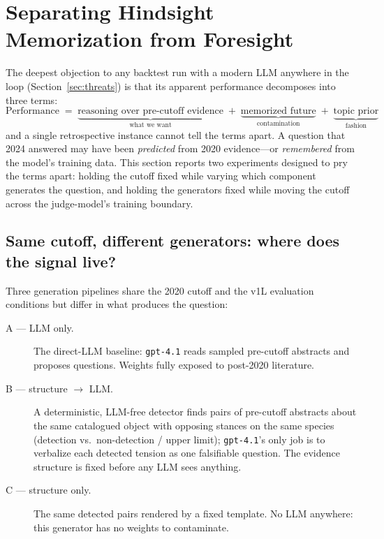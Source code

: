 \section{Separating Hindsight Memorization from Foresight}
\label{sec:foresight}

The deepest objection to any backtest run with a modern LLM anywhere in
the loop (Section~\ref{sec:threats}) is that its apparent performance
decomposes into three terms:
\begin{equation*}
\text{Performance} \;=\;
\underbrace{\text{reasoning over pre-cutoff evidence}}_{\text{what we want}}
\;+\; \underbrace{\text{memorized future}}_{\text{contamination}}
\;+\; \underbrace{\text{topic prior}}_{\text{fashion}}
\end{equation*}
and a single retrospective instance cannot tell the terms apart. A
question that 2024 answered may have been \emph{predicted} from 2020
evidence---or \emph{remembered} from the model's training data. This
section reports two experiments designed to pry the terms apart:
holding the cutoff fixed while varying which component generates the
question, and holding the generators fixed while moving the cutoff
across the judge-model's training boundary.

\subsection{Same cutoff, different generators: where does the signal
live?}
\label{sec:foresight:abc}

Three generation pipelines share the 2020 cutoff and the v1L evaluation
conditions but differ in what produces the question:

\begin{description}
  \item[A --- LLM only.] The direct-LLM baseline: \texttt{gpt-4.1} reads
    sampled pre-cutoff abstracts and proposes questions. Weights fully
    exposed to post-2020 literature.
  \item[B --- structure $\to$ LLM.] A deterministic, LLM-free detector
    finds pairs of pre-cutoff abstracts about the same catalogued object
    with opposing stances on the same species (detection vs.\
    non-detection / upper limit); \texttt{gpt-4.1}'s only job is to
    verbalize each detected tension as one falsifiable question. The
    evidence structure is fixed before any LLM sees anything.
  \item[C --- structure only.] The same detected pairs rendered by a
    fixed template. No LLM anywhere: this generator has no weights to
    contaminate.
\end{description}

